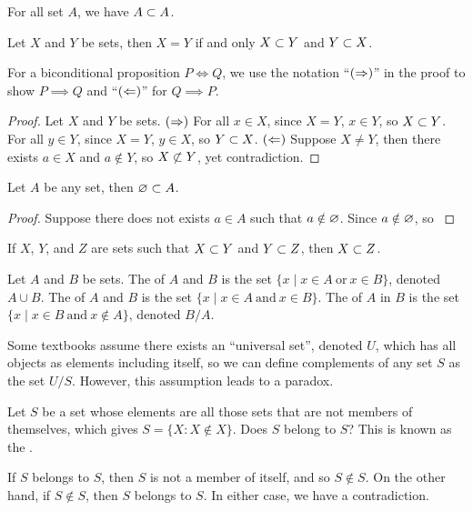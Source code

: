 \documentclass[10pt]{article}
\begin{document}
\begin{example}
    For all set $A$, we have $A\subset A$.
\end{example}
\begin{proposition}
    Let $X$ and $Y$ be sets, then $X=Y$ if and only $X\subset Y$ and $Y\subset X$.
\end{proposition}
\begin{remark}
    For a biconditional proposition $P\iff Q$, we use the notation ``$(\Rightarrow)$'' in the proof to show $P\implies Q$ and ``$(\Leftarrow)$'' for $Q\implies P$.
\end{remark}
\begin{proof}
    Let $X$ and $Y$ be sets. $(\Rightarrow)$ For all $x\in X$, since $X=Y$, $x\in Y$, so $X\subset Y$. For all $y\in Y$, since $X=Y$, $y\in X$, so $Y\subset X$. $(\Leftarrow)$ Suppose $X\ne Y$, then there exists $a\in X$ and $a\notin Y$, so $X\nsub Y$, yet contradiction. 
\end{proof}
\begin{proposition}
    Let $A$ be any set, then $\varnothing\subset A$.
\end{proposition}
\begin{proof}
    Suppose there does not exists $a\in A$ such that $a\notin\varnothing$. Since $a\notin\varnothing$, so $ $
\end{proof}
\begin{example}
    If $X$, $Y$, and $Z$ are sets such that $X\subset Y$ and $Y\subset Z$, then $X\subset Z$.
\end{example}
\begin{definition}
    Let $A$ and $B$ be sets. The  of $A$ and $B$ is the set $\{x\mid x\in A\ \text{or}\ x\in B\}$, denoted $A\cup B$. The  of $A$ and $B$ is the set $\{x\mid x\in A\ \text{and}\ x\in B\}$. The  of $A$ in $B$ is the set $\{x\mid x\in B\ \text{and}\ x\notin A\}$, denoted $B/A$.
\end{definition}
\par
Some textbooks assume there exists an ``universal set'', denoted $U$, which has all objects as elements including itself, so we can define complements of any set $S$ as the set $U/S$. However, this assumption leads to a paradox. 
\begin{example}
    Let $S$ be a set whose elements are all those sets that are not members of themselves, which gives $S=\{X:X\notin X\}$. Does $S$ belong to $S$? This is known as the .
\end{example}
\par
If $S$ belongs to $S$, then $S$ is not a member of itself, and so $S\notin S$. On the other hand, if $S\notin S$, then $S$ belongs to $S$. In either case, we have a contradiction.
\end{document}
